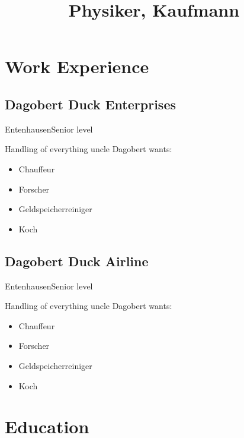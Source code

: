 \documentclass[11pt,a4paper]{moderncv}
\title{Physiker, Kaufmann}
\begin{document}
\maketitle

\section{Work Experience}

\subsection{Dagobert Duck Enterprises}

{Entenhausen}{Senior level}{Handling of everything uncle Dagobert wants:
\begin{itemize}
	\item Chauffeur
	\item Forscher
	\item Geldspeicherreiniger
	\item Koch
\end{itemize}
}



\subsection{Dagobert Duck Airline}

{Entenhausen}{Senior level}{Handling of everything uncle Dagobert wants:
\begin{itemize}
	\item Chauffeur
	\item Forscher
	\item Geldspeicherreiniger
	\item Koch
\end{itemize}
}



\section{Education}


\end{document}
